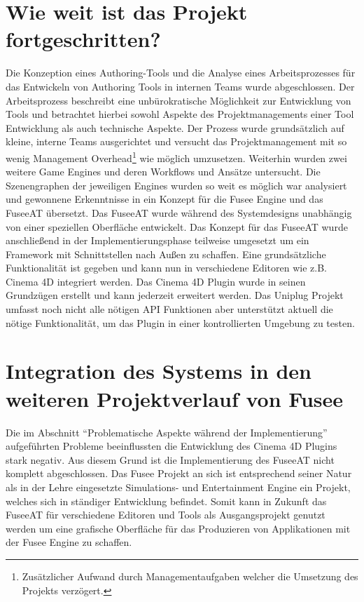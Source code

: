 \documentclass[pagesize, paper=a4, fontsize=12pt, titlepage=true, headings=small, headnosepline, abstractoff, liststotoc, nochapterprefix, plainheadsepline, twoside]{scrreprt}
\begin{document}
\section{Wie weit ist das Projekt fortgeschritten?}
Die Konzeption eines Authoring-Tools und die Analyse eines Arbeitsprozesses für das Entwickeln von Authoring Tools in internen Teams wurde abgeschlossen. Der Arbeitsprozess beschreibt eine unbürokratische Möglichkeit zur Entwicklung von Tools und betrachtet hierbei sowohl Aspekte des Projektmanagements einer Tool Entwicklung als auch technische Aspekte. Der Prozess wurde grundsätzlich auf kleine, interne Teams ausgerichtet und versucht das Projektmanagement mit so wenig Management Overhead\footnote{Zusätzlicher Aufwand durch Managementaufgaben welcher die Umsetzung des Projekts verzögert.} wie möglich umzusetzen. Weiterhin wurden zwei weitere Game Engines und deren Workflows und Ansätze untersucht. Die Szenengraphen der jeweiligen Engines wurden so weit es möglich war analysiert und gewonnene Erkenntnisse in ein Konzept für die Fusee Engine und das FuseeAT übersetzt. Das FuseeAT wurde während des Systemdesigns unabhängig von einer speziellen Oberfläche entwickelt. Das Konzept für das FuseeAT wurde anschließend in der Implementierungsphase teilweise umgesetzt um ein Framework mit Schnittstellen nach Außen zu schaffen. Eine grundsätzliche Funktionalität ist gegeben und kann nun in verschiedene Editoren wie z.B. Cinema 4D integriert werden. Das Cinema 4D Plugin wurde in seinen Grundzügen erstellt und kann jederzeit erweitert werden. Das Uniplug Projekt umfasst noch nicht alle nötigen API Funktionen aber unterstützt aktuell die nötige Funktionalität, um das Plugin in einer kontrollierten Umgebung zu testen.

\section{Integration des Systems in den weiteren Projektverlauf von Fusee}
Die im Abschnitt “Problematische Aspekte während der Implementierung” aufgeführten Probleme beeinflussten die Entwicklung des Cinema 4D Plugins stark negativ. Aus diesem Grund ist die Implementierung des FuseeAT nicht komplett abgeschlossen. Das Fusee Projekt an sich ist entsprechend seiner Natur als in der Lehre eingesetzte Simulations- und Entertainment Engine ein Projekt, welches sich in ständiger Entwicklung befindet. Somit kann in Zukunft das FuseeAT für verschiedene Editoren und Tools als Ausgangsprojekt genutzt werden um eine grafische Oberfläche für das Produzieren von Applikationen mit der Fusee Engine zu schaffen.  
\end{document}
